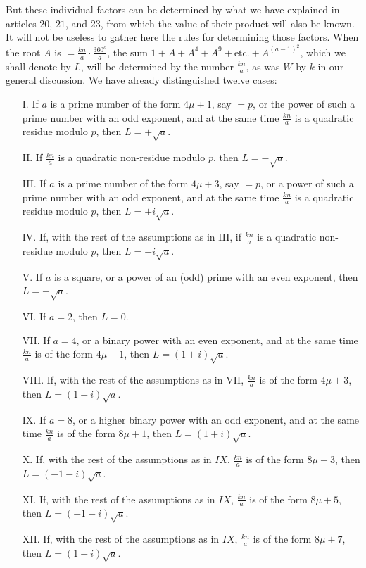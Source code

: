 \documentclass{book}
\theoremstyle{plain}
\theoremstyle{remark}
\begin{document}
But these individual factors can be determined by what we have explained in articles $20$, $21$, and $23$, from which the value of their product will also be known.  It will not be useless to gather here the rules for determining those factors.  When the root $A$ is $= \frac{kn}{a} \cdot \frac{360^o}{a}$, the sum $1 + A + A^4 + A^9 + \textrm{etc.} + A^{(a-1)^2}$, which we shall denote by $L$, will be determined by the number $\frac{kn}{a}$, as was $W$ by $k$ in our general discussion.   We have already distinguished twelve cases:
\begin{enumerate}
\item[I.] If $a$ is a prime number of the form $4\mu+1$, say $=p$, or the power of such a prime number with an odd exponent, and at the same time $\frac{kn}{a}$ is a quadratic residue modulo $p$, then $L = +\sqrt{a}$. 
\item[II.] If $\frac{kn}{a}$ is a quadratic non-residue modulo $p$, then $L =-\sqrt{a}$.
\item[III.] If $a$ is a prime number of the form $4\mu+3$, say $=p$, or a power of such a prime number with an odd exponent, and at the same time $\frac{kn}{a}$ is a quadratic residue modulo $p$, then $L = +i \sqrt{a}$.
\item[IV.] If, with the rest of the assumptions as in III, if $\frac{kn}{a}$ is a quadratic non-residue modulo $p$, then $L = -i \sqrt{a}$.  
\item[V.] If $a$ is a square, or a power of an (odd) prime with an even exponent, then $L = +\sqrt{a}$.
\item[VI.] If $a=2$, then $L = 0$.
\item[VII.] If $a = 4$, or a binary power with an even exponent, and at the same time $\frac{kn}{a}$ is of the form $4\mu+1$, then $L = (1+i)\sqrt{a}$.
\item[VIII.] If, with the rest of the assumptions as in VII, $\frac{kn}{a}$ is of the form $4\mu+3$, then $L = (1-i)\sqrt{a}$.
\item[IX.] If $a=8$, or a higher binary power with an odd exponent, and at the same time $\frac{kn}{a}$ is of the form $8\mu+1$, then $L = (1+i)\sqrt{a}$. 
\item[X.] If, with the rest of the assumptions as in $IX$, $\frac{kn}{a}$ is of the form $8\mu+3$, then $L = (-1-i)\sqrt{a}$.
\item[XI.] If, with the rest of the assumptions as in $IX$, $\frac{kn}{a}$ is of the form $8\mu+5$, then $L = (-1-i)\sqrt{a}$.
\item[XII.] If, with the rest of the assumptions as in $IX$, $\frac{kn}{a}$ is of the form $8\mu+7$, then $L = (1-i) \sqrt{a}$.
\end{enumerate}
\end{document}
